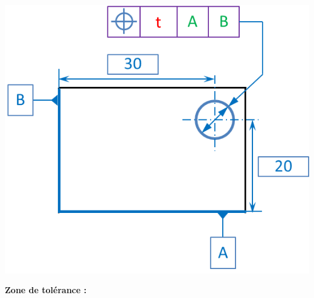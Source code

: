 \documentclass[11pt,oneside]{article}
\begin{document}
\begin{exemple}
\begin{minipage}[t]{.3\linewidth}
\begin{center}
$\;$

\includegraphics[width=.95\textwidth]{png/zt_1}
\end{center}
\end{minipage} \hfill
\begin{minipage}[t]{.3\linewidth}
\textbf{Zone de tolérance :}

\end{minipage} \hfill
\begin{minipage}[t]{.3\linewidth}
\begin{center}
\end{center}
\end{minipage} 
\end{exemple}
\end{document}
